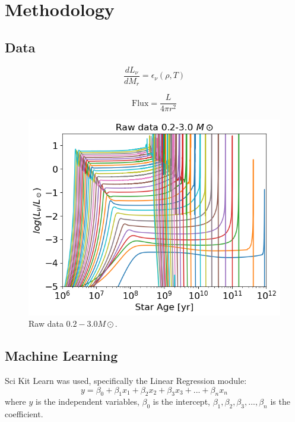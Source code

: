 \section{Methodology}

\subsection{Data}

\begin{equation}
    \frac{dL_\nu}{dM_{r}}=\epsilon_{\nu}(\rho,T)
\end{equation}

\begin{equation}
    \mathrm{Flux}=\frac{L}{4\pi r^2}
\end{equation}

\begin{figure}[H]
	\centering
	\includegraphics[width=\textwidth,height=\textheight]{assets/raw.png}
	\caption{Raw data $0.2-3.0 M\odot$.}
	\label{fig:raw}
\end{figure}


\subsection{Machine Learning}
Sci Kit Learn was used, specifically the Linear Regression module:
\begin{equation}
    y=\beta_{0}+\beta_{1}x_1+\beta_{2}x_2+\beta_{3}x_3+...+\beta_{n}x_n
\end{equation}
where 
$y$ is the independent variables, $\beta_0$ is the intercept, $\beta_{1}, \beta_{2}, \beta_{3},..., \beta_{n}$ is the coefficient. 

